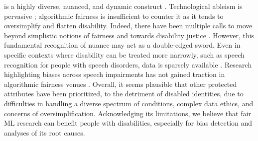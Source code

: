  is a highly diverse, nuanced, and dynamic construct \citep{trewin2018ai}. Technological ableism is pervasive \citep{shew2020ableism}; algorithmic fairness is insufficient to counter it as it tends to oversimplify and flatten disability. Indeed, there have been multiple calls to move beyond simplistic notions of fairness and towards disability justice \citep{bennett2020what,tilmes2022disability}. However, this fundamental recognition of nuance may act as a double-edged sword. Even in specific contexts where disability can be treated more narrowly, such as speech recognition for people with speech disorders, data is sparsely available \citep{papakyriakopoulos2023augmented}. Research highlighting biases across speech impairments \citep{green2021automatic,hidalgo2023quantifying} has not gained traction in algorithmic fairness venues \citep{trewin2019considerations,buyl2022tackling}. Overall, it seems plausible that other protected attributes have been prioritized, to the detriment of disabled identities, due to difficulties in handling a diverse spectrum of conditions, complex data ethics, and concerns of oversimplification. Acknowledging its limitations, we believe that fair ML research can benefit people with disabilities, especially for bias detection and analyses of its root causes. 


